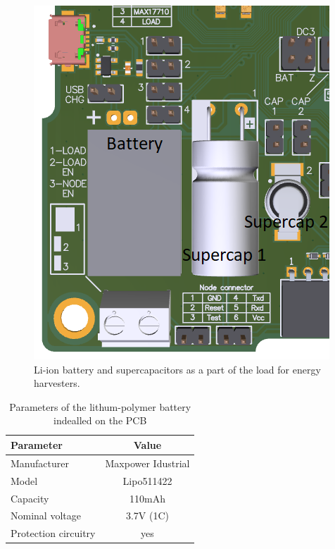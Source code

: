 \documentclass[12pt,a4paper]{article}
\begin{document}
\begin{figure}[ht!]
\includegraphics[scale=0.75]{batteryload.png}
\caption{Li-ion battery and supercapacitors as a part of the load for energy harvesters.}
\label{fig:batteryload}
\end{figure} 

\begin{table}[ht!]
\begin{tabular}{|l|c|}
\hline
\textbf{Parameter}              & \textbf{Value} \\ \hline
Manufacturer & Maxpower Idustrial          \\ \hline
Model                 & Lipo511422        \\ \hline
Capacity                & 110mAh         \\ \hline
Nominal voltage     & 3.7V (1C)            \\ \hline
Protection circuitry     & yes           \\ \hline
\end{tabular}
\caption{Parameters of the lithum-polymer battery indealled on the PCB \cite{battery_params} }
\label{tab:battery}
\end{table}
\end{document}

